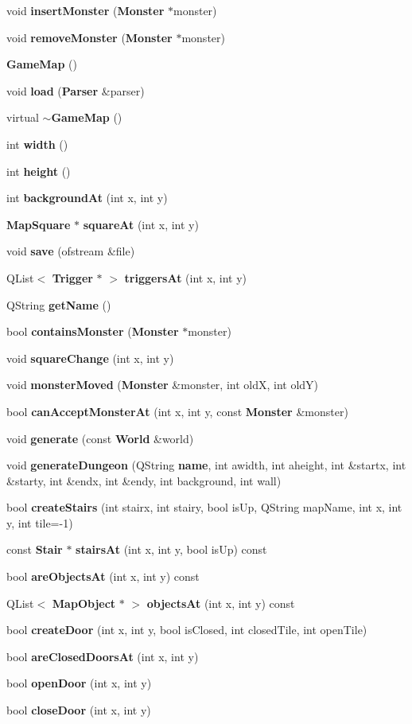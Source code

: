\begin{CompactItemize}
\item 
void {\bf insert\-Monster} ({\bf Monster} $\ast$monster)
\item 
void {\bf remove\-Monster} ({\bf Monster} $\ast$monster)
\item 
{\bf Game\-Map} ()
\item 
void {\bf load} ({\bf Parser} \&parser)
\item 
virtual {\bf $\sim$Game\-Map} ()
\item 
int {\bf width} ()
\item 
int {\bf height} ()
\item 
int {\bf background\-At} (int x, int y)
\item 
{\bf Map\-Square} $\ast$ {\bf square\-At} (int x, int y)
\item 
void {\bf save} (ofstream \&file)
\item 
QList$<$ {\bf Trigger} $\ast$ $>$ {\bf triggers\-At} (int x, int y)
\item 
QString {\bf get\-Name} ()
\item 
bool {\bf contains\-Monster} ({\bf Monster} $\ast$monster)
\item 
void {\bf square\-Change} (int x, int y)
\item 
void {\bf monster\-Moved} ({\bf Monster} \&monster, int old\-X, int old\-Y)
\item 
bool {\bf can\-Accept\-Monster\-At} (int x, int y, const {\bf Monster} \&monster)
\item 
void {\bf generate} (const {\bf World} \&world)
\item 
void {\bf generate\-Dungeon} (QString {\bf name}, int awidth, int aheight, int \&startx, int \&starty, int \&endx, int \&endy, int background, int wall)
\item 
bool {\bf create\-Stairs} (int stairx, int stairy, bool is\-Up, QString map\-Name, int x, int y, int tile=-1)
\item 
const {\bf Stair} $\ast$ {\bf stairs\-At} (int x, int y, bool is\-Up) const 
\item 
bool {\bf are\-Objects\-At} (int x, int y) const 
\item 
QList$<$ {\bf Map\-Object} $\ast$ $>$ {\bf objects\-At} (int x, int y) const 
\item 
bool {\bf create\-Door} (int x, int y, bool is\-Closed, int closed\-Tile, int open\-Tile)
\item 
bool {\bf are\-Closed\-Doors\-At} (int x, int y)
\item 
bool {\bf open\-Door} (int x, int y)
\item 
bool {\bf close\-Door} (int x, int y)
\end{CompactItemize}
